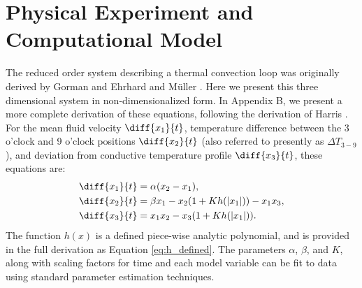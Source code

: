 \section{Physical Experiment and Computational Model}

The reduced order system describing a thermal convection loop was originally derived by Gorman \cite{gorman1986} and Ehrhard and M\"{u}ller \cite{ehrhard1990dynamical}.
Here we present this three dimensional system in non-dimensionalized form.
In Appendix B, we present a more complete derivation of these equations, following the derivation of Harris \cite{harris2011predicting}.
For the mean fluid velocity $\diff{x_1}{t}$, temperature difference between the 3 o'clock and 9 o'clock positions $\diff{x_2}{t}$ (also referred to presently as $\Delta T_{3-9}$), and deviation from conductive temperature profile $\diff{x_3}{t}$, these equations are:
\begin{align}
& \diff{x_1}{t} = \alpha (x_2 - x_1),\\
& \diff{x_2}{t} = \beta x_1 - x_2 (1 + Kh(|x_1|)) - x_1x_3,\\
  & \diff{x_3}{t} = x_1x_2 - x_3 (1 + Kh(|x_1|)) .\end{align}
The function $h(x)$ is a defined piece-wise analytic polynomial, and is provided in the full derivation as Equation \ref{eq:h_defined}.
The parameters $\alpha$, $\beta$, and $K$, along with scaling factors for time and each model variable can be fit to data using standard parameter estimation techniques.

